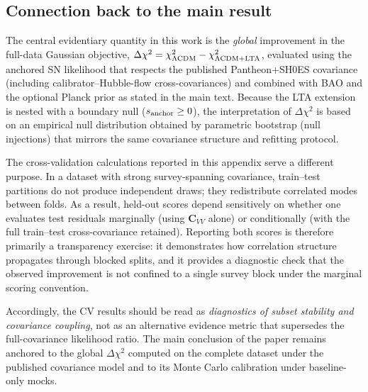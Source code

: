 \documentclass[10pt]{article}
\begin{document}
\subsection{Connection back to the main result}
\label{app:cv:connection}

The central evidentiary quantity in this work is the \emph{global} improvement in the full-data
Gaussian objective,
\(\Delta\chi^2=\chi^2_{\Lambda{\rm CDM}}-\chi^2_{\Lambda{\rm CDM+LTA}}\),
evaluated using the anchored SN likelihood that respects the published Pantheon+SH0ES covariance
(including calibrator--Hubble-flow cross-covariances) and combined with BAO and the optional Planck
prior as stated in the main text. Because the LTA extension is nested with a boundary null
(\(s_{\rm anchor}\ge 0\)), the interpretation of \(\Delta\chi^2\) is based on an empirical null
distribution obtained by parametric bootstrap (null injections) that mirrors the same covariance
structure and refitting protocol.

The cross-validation calculations reported in this appendix serve a different purpose. In a dataset
with strong survey-spanning covariance, train--test partitions do not produce independent draws;
they redistribute correlated modes between folds. As a result, held-out scores depend sensitively
on whether one evaluates test residuals marginally (using \(\bm{C}_{VV}\) alone) or conditionally
(with the full train--test cross-covariance retained). Reporting both scores is therefore primarily
a transparency exercise: it demonstrates how correlation structure propagates through blocked
splits, and it provides a diagnostic check that the observed improvement is not confined to a
single survey block under the marginal scoring convention.

Accordingly, the CV results should be read as \emph{diagnostics of subset stability and covariance
coupling}, not as an alternative evidence metric that supersedes the full-covariance likelihood
ratio. The main conclusion of the paper remains anchored to the global \(\Delta\chi^2\) computed on
the complete dataset under the published covariance model and to its Monte Carlo calibration under
baseline-only mocks.
\end{document}
